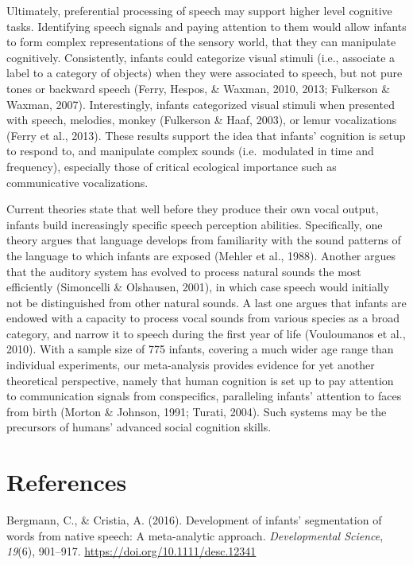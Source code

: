 \documentclass[
  man]{apa6}
\begin{document}
Ultimately, preferential processing of speech may support higher level cognitive tasks. Identifying speech signals and paying attention to them would allow infants to form complex representations of the sensory world, that they can manipulate cognitively. Consistently, infants could categorize visual stimuli (i.e., associate a label to a category of objects) when they were associated to speech, but not pure tones or backward speech (Ferry, Hespos, \& Waxman, 2010, 2013; Fulkerson \& Waxman, 2007). Interestingly, infants categorized visual stimuli when presented with speech, melodies, monkey (Fulkerson \& Haaf, 2003), or lemur vocalizations (Ferry et al., 2013). These results support the idea that infants' cognition is setup to respond to, and manipulate complex sounds (i.e.~modulated in time and frequency), especially those of critical ecological importance such as communicative vocalizations.

Current theories state that well before they produce their own vocal output, infants build increasingly specific speech perception abilities. Specifically, one theory argues that language develops from familiarity with the sound patterns of the language to which infants are exposed (Mehler et al., 1988). Another argues that the auditory system has evolved to process natural sounds the most efficiently (Simoncelli \& Olshausen, 2001), in which case speech would initially not be distinguished from other natural sounds. A last one argues that infants are endowed with a capacity to process vocal sounds from various species as a broad category, and narrow it to speech during the first year of life (Vouloumanos et al., 2010). With a sample size of 775 infants, covering a much wider age range than individual experiments, our meta-analysis provides evidence for yet another theoretical perspective, namely that human cognition is set up to pay attention to communication signals from conspecifics, paralleling infants' attention to faces from birth (Morton \& Johnson, 1991; Turati, 2004). Such systems may be the precursors of humans' advanced social cognition skills.

\newpage

\hypertarget{references}{%
\section{References}\label{references}}

\begingroup
\setlength{\parindent}{-0.5in}
\setlength{\leftskip}{0.5in}

\hypertarget{refs}{}
\leavevmode\hypertarget{ref-bergmann_development_2016}{}%
Bergmann, C., \& Cristia, A. (2016). Development of infants' segmentation of words from native speech: A meta-analytic approach. \emph{Developmental Science}, \emph{19}(6), 901--917. \url{https://doi.org/10.1111/desc.12341}
\end{document}
